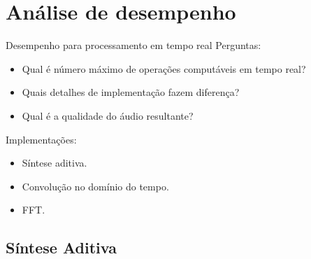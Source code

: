 \section{Análise de desempenho}

\begin{frame}[fragile]{Desempenho para processamento em tempo real}
Perguntas:
\begin{itemize}
  \item Qual é número máximo de operações computáveis em tempo real?
  \item Quais detalhes de implementação fazem diferença?
  \item Qual é a qualidade do áudio resultante?
\end{itemize}
\vspace{2em}
Implementações:
\begin{itemize}
  \item Síntese aditiva.
  \item Convolução no domínio do tempo.
  \item FFT.
\end{itemize}
\end{frame}


\subsection{Síntese Aditiva}

